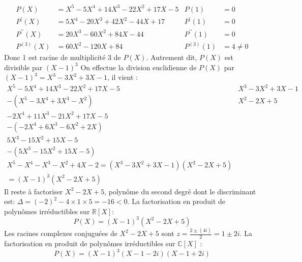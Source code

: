 {{$$
\begin{array}{rlrl}
P(X) & =X^5-5 X^4+14 X^3-22 X^2+17 X-5 & P(1) & =0 \\
P^{\prime}(X) & =5 X^4-20 X^3+42 X^2-44 X+17 & P^{\prime}(1) & =0 \\
P^{\prime \prime}(X) & =20 X^3-60 X^2+84 X-44 & P^{\prime \prime}(1) & =0 \\
P^{(3)}(X) & =60 X^2-120 X+84 & P^{(3)}(1) & =4 \neq 0
\end{array}
$$
Donc 1 est racine de multiplicité 3 de $P(X)$. Autrement dit, $P(X)$ est divisible par $(X-1)^3$
On effectue la division euclidienne de $P(X)$ par $(X-1)^3=X^3-3 X^2+3 X-1$, il vient :
$$
\begin{array}{r|r}
X^5-5 X^4+14 X^3-22 X^2+17 X-5 & X^3-3 X^2+3 X-1 \\
-\left(X^5-3 X^4+3 X^3-X^2\right) & X^2-2 X+5 \\
\hline-2 X^4+11 X^3-21 X^2+17 X-5 & \\
-\left(-2 X^4+6 X^3-6 X^2+2 X\right) & \\
\hline 5 X^3-15 X^2+15 X-5 & \\
-\left(5 X^3-15 X^2+15 X-5\right) & \\
\hline X^5-X^4-X^3-X^2+4 X-2=\left(X^3-3 X^2+3 X-1\right)\left(X^2-2 X+5\right) \\
=(X-1)^3\left(X^2-2 X+5\right)
\end{array}
$$
Il reste à factoriser $X^2-2 X+5$, polynôme du second degré dont le discriminant est: $\Delta=(-2)^2-4 \times 1 \times 5=-16<0$. La factorisation en produit de polynômes irréductibles sur $\mathbb{R}[X]:$
$$
P(X)=(X-1)^3\left(X^2-2 X+5\right)
$$
Les racines complexes conjuguées de $X^2-2 X+5$ sont $z=\frac{2 \pm(4 i)}{2}=1 \pm 2 i$. La factorisation en produit de polynômes irréductibles sur $\mathbb{C}[X]$ :
$$
P(X)=(X-1)^3(X-1-2 i)(X-1+2 i)
$$ }}
